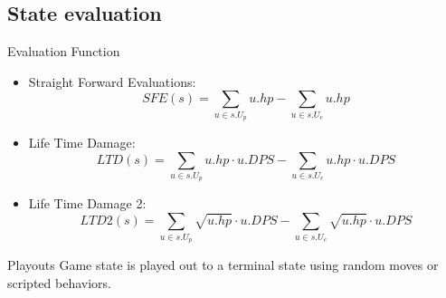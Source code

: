 \documentclass{beamer}
\newenvironment{framesubsec}{
    \begin{frame}{\subsecname}
}{\end{frame}}
\begin{document}
\subsection{State evaluation}
\begin{framesubsec}
    \begin{block}{Evaluation Function}
        \begin{itemize}
    \item Straight Forward Evaluations:
        $$
            \displaystyle{SFE(s) = \sum_{u \in s.U_p} u.hp - \sum_{u \in s.U_e} u.hp } 
            $$

        \item Life Time Damage:
            $$
                \displaystyle{LTD(s) = \sum_{u \in s.U_p} u.hp \cdot u.DPS- \sum_{u \in s.U_e} u.hp \cdot u.DPS } 
                $$

            \item Life Time Damage 2:
                $$
                    \displaystyle{LTD2(s) = \sum_{u \in s.U_p} \sqrt{u.hp} \cdot u.DPS - \sum_{u \in s.U_e} \sqrt{u.hp} \cdot u.DPS } 
                    $$

            \end{itemize}
        \end{block}
\end{framesubsec}

\begin{framesubsec}
        \begin{block}{Playouts}
            Game state is played out to a terminal state  using random moves or scripted behaviors.
                    \end{block}
\end{framesubsec}
\end{document}

